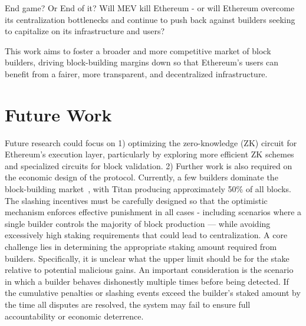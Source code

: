 \documentclass[11pt]{article}
\begin{document}
End game? Or End of it?
Will MEV kill Ethereum - or will Ethereum overcome its centralization bottlenecks and continue to push back against builders seeking to capitalize on its infrastructure and users?

This work aims to foster a broader and more competitive market of block builders, driving block-building margins down so that Ethereum’s users can benefit from a fairer, more transparent, and decentralized infrastructure.

\section{Future Work}
\label{sec:future_work}
Future research could focus on 1) optimizing the zero-knowledge (ZK) circuit for Ethereum’s execution layer, particularly by exploring more efficient ZK schemes and specialized circuits for block validation.
2) Further work is also required on the economic design of the protocol. Currently, a few builders dominate the block-building market~\cite{relayscan}, with Titan producing approximately 50\% of all blocks.
The slashing incentives must be carefully designed so that the optimistic mechanism enforces effective punishment in all cases - including scenarios where a single builder controls the majority of block production — while avoiding excessively high staking requirements that could lead to centralization.
A core challenge lies in determining the appropriate staking amount required from builders. Specifically, it is unclear what the upper limit should be for the stake relative to potential malicious gains. An important consideration is the scenario in which a builder behaves dishonestly multiple times before being detected. If the cumulative penalties or slashing events exceed the builder’s staked amount by the time all disputes are resolved, the system may fail to ensure full accountability or economic deterrence.



\end{document}
